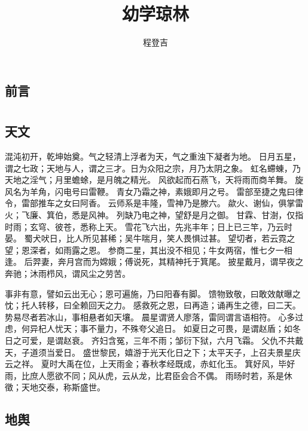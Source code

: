 \documentclass[12pt,UTF8]{ctexbook}
\title{\heiti\zihao{0} 幼学琼林}
\author{程登吉}
\date{}
\begin{document}
\maketitle
\tableofcontents

\frontmatter
\chapter{前言}



\mainmatter

\part{}

\chapter{天文}

混沌初开，乾坤始奠。气之轻清上浮者为天，气之重浊下凝者为地。
日月五星，谓之七政；天地与人，谓之三才。日为众阳之宗，月乃太阴之象。
虹名螮蝀，乃天地之淫气；月里蟾蜍，是月魄之精光。
风欲起而石燕飞，天将雨而商羊舞。
旋风名为羊角，闪电号曰雷鞭。
青女乃霜之神，素娥即月之号。
雷部至捷之鬼曰律令，雷部推车之女曰阿香。
云师系是丰隆，雪神乃是滕六。
歘火、谢仙，俱掌雷火；飞廉、箕伯，悉是风神。
列缺乃电之神，望舒是月之御。
甘霖、甘澍，仅指时雨；玄穹、彼苍，悉称上天。
雪花飞六出，先兆丰年；日上已三竿，乃云时晏。
蜀犬吠日，比人所见甚稀；吴牛喘月，笑人畏惧过甚。
望切者，若云霓之望；恩深者，如雨露之恩。
参商二星，其出没不相见；牛女两宿，惟七夕一相逢。
后羿妻，奔月宫而为嫦娥；傅说死，其精神托于箕尾。
披星戴月，谓早夜之奔驰；沐雨栉风，谓风尘之劳苦。

事非有意，譬如云出无心；恩可遍施，乃曰阳春有脚。
馈物致敬，曰敢效献曝之忱；托人转移，曰全赖回天之力。
感救死之恩，曰再造；诵再生之德，曰二天。
势易尽者若冰山，事相悬者如天壤。
晨星谓贤人廖落，雷同谓言语相符。
心多过虑，何异杞人忧天；事不量力，不殊夸父追日。
如夏日之可畏，是谓赵盾；如冬日之可爱，是谓赵衰。
齐妇含冤，三年不雨；邹衍下狱，六月飞霜。
父仇不共戴天，子道须当爱日。
盛世黎民，嬉游于光天化日之下；太平天子，上召夫景星庆云之祥。
夏时大禹在位，上天雨金；春秋孝经既成，赤虹化玉。
箕好风，毕好雨，比庶人愿欲不同；风从虎，云从龙，比君臣会合不偶。
雨旸时若，系是休徵；天地交泰，称斯盛世。

\chapter{地舆}
\end{document}
